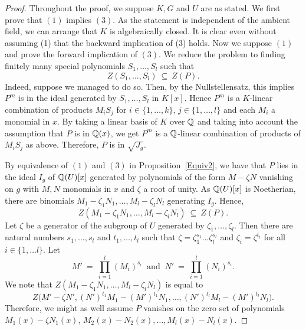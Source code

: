 \begin{proof}
Throughout the proof, we suppose $K, G$ and $U$ are as stated.
We first prove that $ (1)$ implies $(3)$. As the statement is independent of the ambient field, we can arrange that \(K\) is algebraically closed. It is clear even without assuming (1) that the backward implication of (3) holds. 
Now we suppose $(1)$ and prove the forward implication of $(3)$. We reduce the problem to finding finitely many special polynomials \(S_1, \ldots, S_l \) such that 
$$ Z(S_1, \ldots, S_l)\ \subseteq\ Z(P) .$$ 
Indeed, suppose we managed to do so. Then, by the Nullstellensatz, this implies \( P^m \) is in the ideal generated by \( S_1, \ldots, S_l\) in \(K[x]\). Hence \(P^m\) is a \(K\)-linear combination of products \(M_i S_j\) for $i \in \{1, \ldots, k\} $, $j \in \{ 1,  \ldots, l\}$ and each $M_i$ a monomial in $x$. By taking a linear basis of \(K\) over \(\mathbb{Q}\) and taking into account the assumption that \( P\) is in \( \mathbb{Q}(x) \), we get \(P^m\) is a \(\mathbb{Q}\)-linear combination of products of \( M_iS_j\) as above. Therefore, \(P\) is in \(\sqrt{J_g}\).

By equivalence of $(1)$ and $(3)$ in Proposition~\ref{Equiv2}, we have that \( P\) lies in the ideal \(I_g\) of \(\mathbb{Q}(U)[x]\) generated by polynomials of the form \( M - \zeta N \) vanishing on $g$ with \(M, N\) monomials in \(x\) and \( \zeta\) a root of unity.
As \(\mathbb{Q}(U)[x]\) is Noetherian, there are binomials \( M_1 - \zeta_1 N_1, \ldots,  M_l - \zeta_l N_l\) generating \(I_g\).
Hence, 
$$ Z(M_1 - \zeta_1 N_1, \ldots,  M_l - \zeta_l N_l)\ \subseteq\ Z(P). $$ Let $\zeta$ be a generator of the subgroup of $U$ generated by $\zeta_1, \ldots, \zeta_l$.
Then there are  natural numbers $s_1, \ldots, s_l$ and $t_1, \ldots, t_l$ such that  $\zeta = \zeta_1^{s_1}\ldots \zeta_l^{s_l}$ and $\zeta_i = \zeta^{t_i}$ for all $i \in \{1, \ldots l \}$. 
Let $$M'\ =\ \prod_{i=1}^l(M_i)^{s_i}\ \text{ and }\ N'\ =\ \prod_{i=1}^l(N_i)^{s_i}.$$
We note that $Z(M_1 - \zeta_1 N_1, \ldots,  M_l - \zeta_l N_l)$ is equal to $$ Z \big(M' - \zeta N', (N')^{t_1}M_1- (M')^{t_1}N_1, \ldots, (N')^{t_l}M_l- (M')^{t_l}N_l\big).$$
Therefore, we might as well assume $P$ vanishes on the zero set of polynomials $M_1(x) - \zeta N_1(x)$, $M_2(x)-N_2(x), \ldots, M_l(x) - N_l(x)$.


\end{proof}
